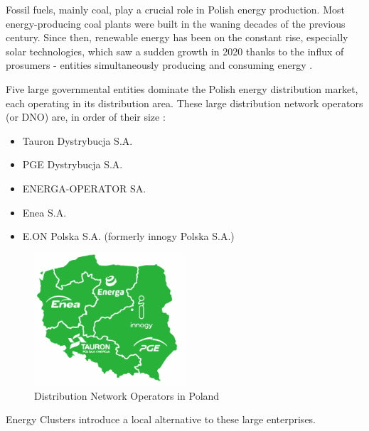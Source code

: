 \par Fossil fuels, mainly coal, play a crucial role in Polish energy production. Most energy-producing coal plants were built in the waning decades of the previous century. Since then, renewable energy has been on the constant rise, especially solar technologies, which saw a sudden growth in 2020 thanks to the influx of prosumers - entities simultaneously producing and consuming energy \citep{CarbonPoland} \citep{Prosumer}.
\par Five large governmental entities dominate the Polish energy distribution market, each operating in its distribution area. These large distribution network operators (or DNO) are, in order of their size \citep{dostawcyPradu}:
\begin{itemize}
  \item Tauron Dystrybucja S.A.
  \item PGE Dystrybucja S.A.
  \item ENERGA-OPERATOR SA.
  \item Enea S.A.
  \item E.ON Polska S.A. (formerly innogy Polska S.A.)
\end{itemize}
\begin{figure}[htbp]
 \centering
 \includegraphics[width=0.5\textwidth]{gfx/EnergyDistributionMap}
 \caption{Distribution Network Operators in Poland \citep{mapkaEprad}}
 \label{fig:chapter02:energydistribution}
\end{figure}
\par Energy Clusters introduce a local alternative to these large enterprises. 
